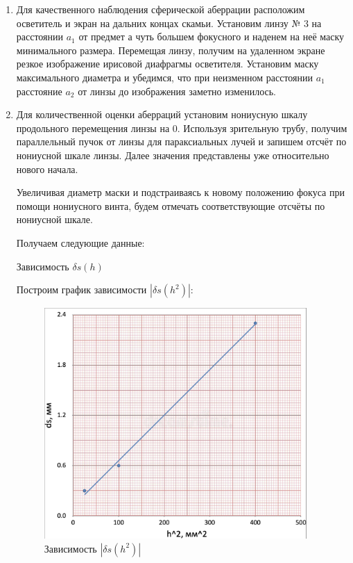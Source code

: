 \documentclass[12pt,a4paper]{article}
\begin{document}
	\begin{enumerate}
		\item Для качественного наблюдения сферической аберрации расположим осветитель и экран на дальних концах скамьи. Установим линзу № 3 на расстоянии $a_1$ от предмет а чуть большем фокусного и наденем на неё маску минимального размера. Перемещая линзу, получим на удаленном экране резкое изображение ирисовой диафрагмы осветителя. Установим маску максимального диаметра и убедимся, что при неизменном расстоянии $a_1$ расстояние $a_2$ от линзы до изображения заметно изменилось.
		
		\item Для количественной оценки аберраций установим нониусную шкалу продольного перемещения линзы на 0. Используя зрительную трубу, получим параллельный пучок от линзы для параксиальных лучей и запишем отсчёт по нониусной шкале линзы. Далее значения представлены уже относительно нового начала. 
		
		Увеличивая диаметр маски и подстраиваясь к новому положению фокуса при помощи нониусного винта, будем отмечать соответствующие отсчёты по нониусной шкале.
		
		Получаем следующие данные:
		

        \begin{table}[H]
    	   \centering
    	   \footnotesize
    	   
    	   \caption{Зависимость $\delta s(h)$}
    	   \label{tab:t1}
        \end{table}   
	
		Построим график зависимости $|\delta s(h^2)|$:
    
        \begin{figure}[H]
            \centering
            \includegraphics[width=10cm]{src/ds_h^2.png}
            \caption{Зависимость $|\delta s(h^2)|$}
            \label{fig:dsh2}
        \end{figure}


\end{enumerate}
\end{document}
